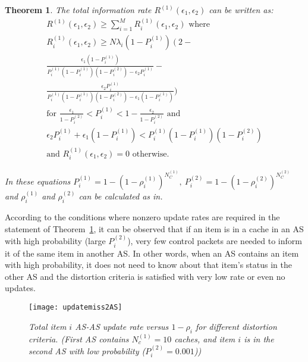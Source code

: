 \documentclass[conference]{IEEEtran}
\theoremstyle{plain}
\newtheorem{theorem}{Theorem}
\theoremstyle{remark}
\begin{document}
\begin{theorem}\label{thm:2}
The total information rate $R^{(1)}(\epsilon_1,\epsilon_2)$ can be written as:
\begin{eqnarray}
   &R^{(1)}(\epsilon_1,\epsilon_2)\geq \sum_{i=1}^M R^{(1)}_i(\epsilon_1,\epsilon_2) \mbox{ where}&\nonumber\\
   &R^{(1)}_i(\epsilon_1,\epsilon_2)\geq N\lambda_i (1-P^{(1)}_i)\left(2 - \right.& \nonumber  \\
   &\frac{\epsilon_1(1-P^{(1)}_i)}{P^{(1)}_i(1-P^{(1)}_i)(1-P^{(2)}_i)-\epsilon_2P^{(1)}_i}-& \nonumber\\
	 &\frac{\epsilon_2P^{(1)}_i}{P^{(1)}_i(1-P^{(1)}_i)(1-P^{(2)}_i)-\epsilon_1(1-P^{(1)}_i)})& \nonumber\\
   &\mbox{for } \frac{\epsilon_1}{1-P^{(2)}_i} < P^{(1)}_i < 1-\frac{\epsilon_2}{1-P^{(2)}_i} \mbox{ and}&\nonumber \\
   &\epsilon_2P^{(1)}_i+\epsilon_1(1-P^{(1)}_i) < P^{(1)}_i(1-P^{(1)}_i)(1-P^{(2)}_i)& \label{eq:cond1}\nonumber\\
   &\mbox{and }R^{(1)}_i(\epsilon_1,\epsilon_2)=0 \mbox{ otherwise.}&
\end{eqnarray}

In these equations $P^{(1)}_i=1-(1-\rho^{(1)}_i)^{N^{(1)}_C},\ P^{(2)}_i=1-(1-\rho^{(2)}_i)^{N^{(2)}_C}$
and $\rho^{(1)}_i$ and $\rho^{(2)}_i$ can be calculated as in\cite{Dan1990Approximate}.
\end{theorem}

According to the conditions where nonzero update rates are required in the statement of Theorem~\ref{thm:2}, it can be observed that if an item is in a cache in an AS with high probability (large $P^{(2)}_i$), very few  control packets are needed to inform it of the same item in another AS. In other words, when an AS contains an item with high probability, it does not need to know about that item's status in the other AS and the distortion criteria is satisfied with very low rate or even no updates.

\begin{figure}[http]
    \center
      \texttt{[image: updatemiss2AS]}\\
      \caption{\textit{Total item $i$ AS-AS update rate versus $1-\rho_i$ for different distortion criteria. (First AS contains $N^{(1)}_c=10$ caches, and item $i$ is in the second AS with low probability ($P^{(2)}_i=0.001$))}}
    \label{fig:updatemiss2AS}
\end{figure}
\end{document}
